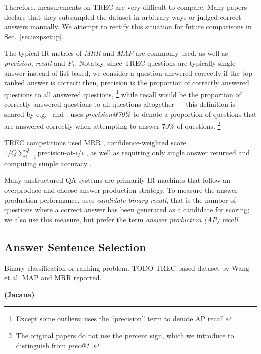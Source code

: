 Therefore, measurements on TREC are very difficult to compare.  Many papers
declare that they subsampled the dataset in arbitrary ways or judged correct
answers manually.  We attempt to rectify this situation for future comparisons
in Sec.~\ref{sec:expsetup}.

The typical IR metrics of \textit{MRR} and \textit{MAP} are commonly
used, as well as \textit{precision}, \textit{recall} and \textit{F$_1$}.
Notably, since TREC questions are typically single-answer instead of list-based,
we consider a question answered correctly if the top-ranked answer is correct:
then, precision is the proportion of correctly answered questions to all
answered questions,%
\footnote{Except some outliers; \cite{Ephyra2006} uses the ``precision'' term
	to denote AP recall.}
while recall would be the proportion of correctly answered questions to all
questions altogether --- this definition is shared by
e.g.\ \cite{TreeEdit2013Yao} and \cite{QuASE}.
\cite{WatsonOverview} uses \textit{precision@70\%} to denote a proportion
of questions that are answered correctly when attempting to answer 70\% of questions.%
\footnote{The original papers do not use the percent sign, which we introduce
	to distinguish from \textit{prec@1} \citep{Semantic2014Bordes}.}

TREC competitions used MRR \citep{TREC8,TREC9,TREC10},
confidence-weighted score $1/Q \sum_{i=1}^Q \textrm{precision-at-$i$} / i$ \citep{TREC11},
as well as requiring only single answer returned and computing simple accuracy \citep{TREC12}.

Many unstructured QA systems are primarily IR machines that follow
an overproduce-and-choose answer production strategy.  To measure
the answer production performance, \cite{WatsonIR} uses \textit{candidate binary recall},
that is the number of questions where a correct answer has been generated as a candidate
for scoring;
we also use this measure, but prefer the term \textit{answer production (AP) recall}.


\subsection{Answer Sentence Selection}
\label{sec:anssentsel}

Binary classification or ranking problem.
TODO TREC-based dataset by Wang et al.
MAP and MRR reported.

\textbf{(Jacana)} \citep{TreeEdit2013Yao}

